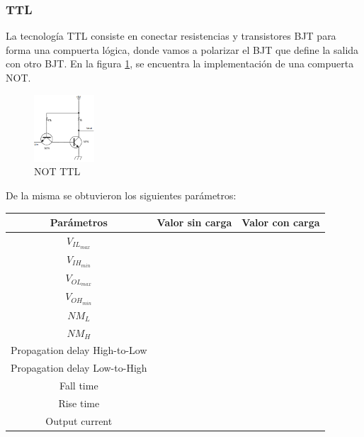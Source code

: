 \subsubsection{TTL}
La tecnología TTL consiste en conectar resistencias y transistores BJT para forma una compuerta lógica, donde vamos a polarizar el BJT que define la salida con otro BJT. En la figura \ref{fig:eje1_2}, se encuentra la implementación de una compuerta NOT.
\begin{figure}[H]
	\centering
	\includegraphics[width=0.2\textwidth]{Ejercicio1/TTL.png}
	\caption{NOT TTL}
	\label{fig:eje1_2}
\end{figure}
De la misma se obtuvieron los siguientes parámetros:
\begin{table}[H]
	\centering
	\begin{tabular}{|c|c|c|}
		\hline
		Parámetros & Valor sin carga & Valor con carga\\
		\hline
		$V_{IL_{max}}$ & & \\
		\hline
		$V_{IH_{min}}$ & & \\
		\hline
		$V_{OL_{max}}$ & & \\
		\hline
		$V_{OH_{min}}$ & & \\
		\hline
		$NM_{L}$ & & \\
		\hline
		$NM_{H}$ & & \\
		\hline
		Propagation delay High-to-Low & & \\
		\hline
		Propagation delay Low-to-High & & \\
		\hline
		Fall time & & \\
		\hline
		Rise time & & \\
		\hline
		Output current & & \\
		\hline
	\end{tabular}
\end{table}

